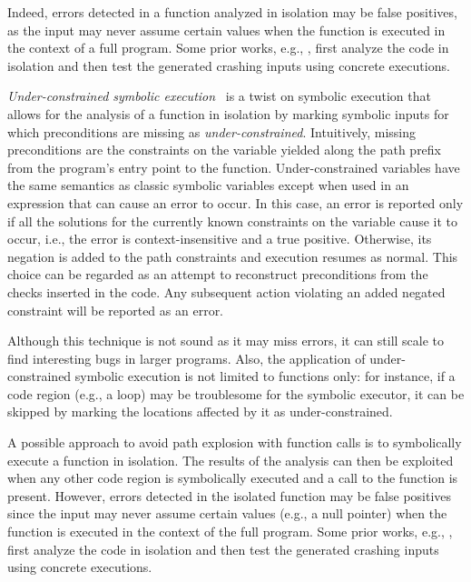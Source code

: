 Indeed, errors detected in a function analyzed in isolation may be false positives, as the input may never assume certain values when the function is executed in the context of a full program. Some prior works, e.g., \cite{CS-ICSE05}, first analyze the code in isolation and then test the generated crashing inputs using concrete executions.

{\em Under-constrained symbolic execution}~\cite{ED-ISSTA07} is a twist on symbolic execution that allows for the analysis of a function in isolation by marking symbolic inputs for which preconditions are missing as {\em under-constrained}. Intuitively, missing preconditions are the constraints on the variable yielded along the path prefix from the program's entry point to the function. Under-constrained variables have the same semantics as classic symbolic variables except when used in an expression that can cause an error to occur. In this case, an error is reported only if all the solutions for the currently known constraints on the variable cause it to occur, i.e., the error is context-insensitive and a true positive. Otherwise, its negation is added to the path constraints and execution resumes as normal. This choice can be regarded as an attempt to reconstruct preconditions from the checks inserted in the code. Any subsequent action violating an added negated constraint will be reported as an error.

Although this technique is not sound as it may miss errors, it can still scale to find interesting bugs in larger programs. Also, the application of under-constrained symbolic execution is not limited to functions only: for instance, if a code region (e.g., a loop) may be troublesome for the symbolic executor, it can be skipped by marking the locations affected by it as under-constrained.


\iffalse %
A possible approach to avoid path explosion with function calls is to symbolically execute a function in isolation. The results of the analysis can then be exploited when any other code region is symbolically executed and a call to the function is present. However, errors detected in the isolated function may be false positives since the input may never assume certain values (e.g., a null pointer) when the function is executed in the context of the full program. Some prior works, e.g., \cite{CS-ICSE05}, first analyze the code in isolation and then test the generated crashing inputs using concrete executions. %

